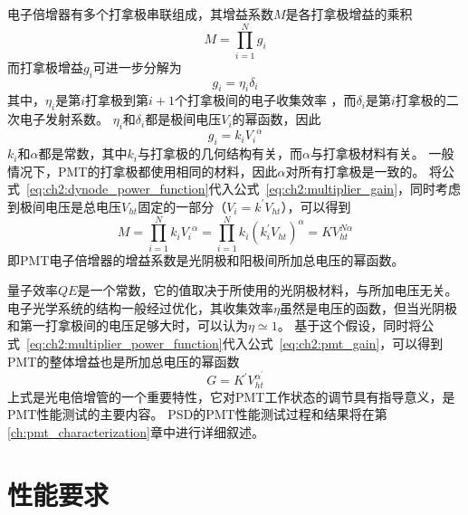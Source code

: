 电子倍增器有多个打拿极串联组成，其增益系数$M$是各打拿极增益的乘积
\begin{equation}
M = \prod_{i=1}^{N} g_{i}
\label{eq:ch2:multiplier_gain}
\end{equation}
而打拿极增益$g_i$可进一步分解为
\begin{equation}
g_{i} = \eta_{i} \delta_{i}
\end{equation}
其中，$\eta_{i}$是第$i$打拿极到第$i+1$个打拿极间的电子收集效率 ，而$\delta_i$是第$i$打拿极的二次电子发射系数。
$\eta_{i}$和$\delta_i$都是极间电压$V_i$的幂函数，因此
\begin{equation}
g_{i} = k_i {V_i}^\alpha
\label{eq:ch2:dynode_power_function}
\end{equation}
$k_i$和$\alpha$都是常数，其中$k_i$与打拿极的几何结构有关，而$\alpha$与打拿极材料有关。
一般情况下，PMT的打拿极都使用相同的材料，因此$\alpha$对所有打拿极是一致的。
将公式~\ref{eq:ch2:dynode_power_function}代入公式~\ref{eq:ch2:multiplier_gain}，同时考虑到极间电压是总电压$V_{ht}$固定的一部分（$V_i=k^{'}V_{ht}$），可以得到
\begin{equation}
M = \prod_{i=1}^{N} k_i{V_i}^\alpha = \prod_{i=1}^{N} k_i{(k^{'}_i V_{ht})}^\alpha = KV_{ht}^{N\alpha}
\label{eq:ch2:multiplier_power_function}
\end{equation}
即PMT电子倍增器的增益系数是光阴极和阳极间所加总电压的幂函数。

量子效率$QE$是一个常数，它的值取决于所使用的光阴极材料，与所加电压无关。
电子光学系统的结构一般经过优化，其收集效率$\eta$虽然是电压的函数，但当光阴极和第一打拿极间的电压足够大时，可以认为$\eta\simeq1$。
基于这个假设，同时将公式~\ref{eq:ch2:multiplier_power_function}代入公式~\ref{eq:ch2:pmt_gain}，可以得到PMT的整体增益也是所加总电压的幂函数
\begin{equation}
G = K^{'} V_{ht}^{{\alpha}^{'}}
\label{eq:ch2:pmt_gain_power_function}
\end{equation}
上式是光电倍增管的一个重要特性，它对PMT工作状态的调节具有指导意义，是PMT性能测试的主要内容。
PSD的PMT性能测试过程和结果将在第\ref{ch:pmt_characterization}章中进行详细叙述。

\section{性能要求}
\label{sec:psd_requirements}

